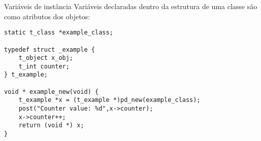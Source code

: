 \begin{frame}[fragile]{Variáveis de instância}
Variáveis declaradas dentro da estrutura de uma classe são como atributos dos
objetos:
\begin{lstlisting}
static t_class *example_class;

typedef struct _example {
    t_object x_obj;
    t_int counter;
} t_example;

void * example_new(void) {
    t_example *x = (t_example *)pd_new(example_class);
    post("Counter value: %d",x->counter);
    x->counter++;
    return (void *) x;
}
\end{lstlisting}
\end{frame}

